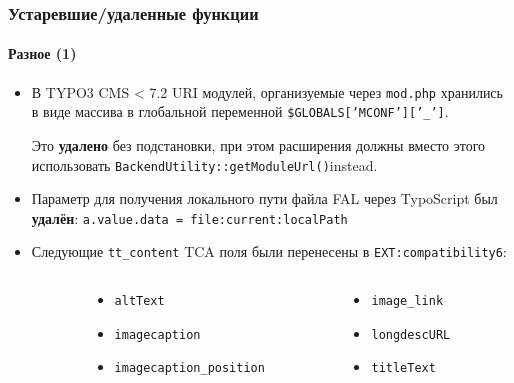 \begin{frame}[fragile]
	\frametitle{Устаревшие/удаленные функции}
	\framesubtitle{Разное (1)}

	\begin{itemize}

		\item В TYPO3 CMS < 7.2 URI модулей, организуемые через
			\texttt{mod.php} хранились в виде массива в глобальной переменной
			\small\texttt{\$GLOBALS['MCONF']['\_']}\normalsize.

			Это \textbf{удалено} без подстановки, при этом расширения должны вместо этого использовать
			\texttt{BackendUtility::getModuleUrl()}\normalsize\space instead.

		\item Параметр для получения локального пути файла FAL через TypoScript был
			 \textbf{удалён}: \texttt{a.value.data = file:current:localPath}

		\item Следующие \texttt{tt\_content} TCA поля были перенесены в
			\texttt{EXT:compatibility6}:

	\end{itemize}

	\vspace{-0.2cm}

	\begin{columns}[T]
		\begin{column}{.06\textwidth}
		\end{column}
		\begin{column}{.47\textwidth}
			\smaller
			\begin{itemize}
				\item \texttt{altText}
				\item \texttt{imagecaption}
				\item \texttt{imagecaption\_position}
			\end{itemize}
			\normalsize
		\end{column}
		\begin{column}{.47\textwidth}
			\smaller
			\begin{itemize}
				\item \texttt{image\_link}
				\item \texttt{longdescURL}
				\item \texttt{titleText}
			\end{itemize}
			\normalsize
		\end{column}
	\end{columns}

\end{frame}

